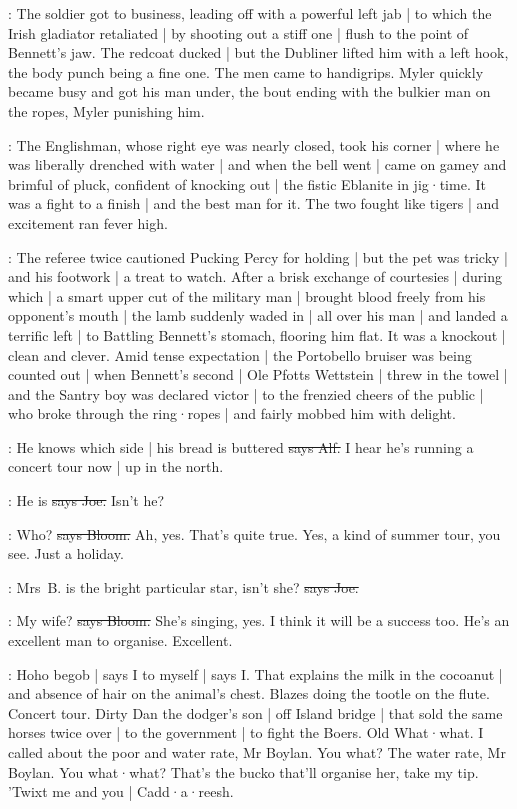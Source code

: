 :
The soldier got to business,
leading off with a powerful left jab |
to which the Irish gladiator retaliated |
by shooting out a stiff one |
flush to the point of Bennett's jaw.
The redcoat ducked |
but the Dubliner lifted him with a left hook,
the body punch being a fine one.
The men came to handigrips.
Myler quickly became busy and got his man under,
the bout ending with the bulkier man on the ropes,
Myler punishing him.

:
The Englishman,
whose right eye was nearly closed,
took his corner |
where he was liberally drenched with water |
and when the bell went |
came on gamey and brimful of pluck,
confident of knocking out |
the fistic Eblanite in jig·time.
It was a fight to a finish |
and the best man for it.
The two fought like tigers |
and excitement ran fever high.

:
The referee twice cautioned Pucking Percy for holding |
but the pet was tricky |
and his footwork |
a treat to watch.
After a brisk exchange of courtesies |
during which |
a smart upper cut of the military man
 |
brought blood freely from his opponent's mouth |
the lamb suddenly waded in |
all over his man |
and landed a terrific left |
to Battling Bennett's stomach,
flooring him flat.
It was a knockout |
clean and clever.
Amid tense expectation |
the Portobello bruiser was being counted out |
when Bennett's second |
Ole Pfotts Wettstein |
threw in the towel |
and the Santry boy was declared victor |
to the frenzied cheers of the public |
who broke through the ring·ropes |
and fairly mobbed him with delight.

\bergan:
He knows which side |
his bread is buttered
\sout{says Alf.}
I hear he's running a concert tour now |
up in the north.

\joe:
He is
\sout{says Joe.}
Isn't he?

\Bloom:
Who?
\sout{says Bloom.}
Ah,
yes.
That's quite true.
Yes,
a kind of summer tour,
you see.
Just a holiday.

\joe:
Mrs~B. is the bright particular star,
isn't she?
\sout{says Joe.}

\Bloom:
My wife?
\sout{says Bloom.}
She's singing,
yes.
I think it will be a success too.
He's an excellent man to organise.
Excellent.

\Nq:
Hoho begob |
says I to myself |
says I.
That explains the milk in the cocoanut |
and absence of hair on the animal's chest.
Blazes doing the tootle on the flute.
Concert tour.
Dirty Dan the dodger's son |
off Island bridge |
that sold the same horses twice over |
to the government |
to fight the Boers.
Old What·what.
I called about the poor and water rate,
Mr Boylan.
You what?
The water rate,
Mr Boylan.
You what·what?
That's the bucko that'll organise her,
take my tip.
'Twixt me and you |
Cadd·a·reesh.


